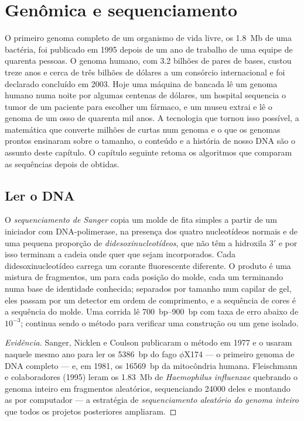 \chapter{Genômica e sequenciamento}\label{ch:b3:genomics}

O primeiro genoma completo de um organismo de vida livre, os
\qty{1.8}{Mb} de uma bactéria, foi publicado em 1995 depois de um ano
de trabalho de uma equipe de quarenta pessoas. O genoma humano, com
\num{3.2} bilhões de pares de bases, custou treze anos e cerca de três
bilhões de dólares a um consórcio internacional e foi declarado
concluído em 2003. Hoje uma máquina de bancada lê um genoma humano
numa noite por algumas centenas de dólares, um hospital sequencia o
tumor de um paciente para escolher um fármaco, e um museu extrai e lê
o genoma de um osso de quarenta mil anos. A tecnologia que tornou isso
possível, a matemática que converte milhões de  curtas num
genoma e o que os genomas prontos ensinaram sobre o tamanho, o
conteúdo e a história de nosso DNA são o assunto deste capítulo. O
capítulo seguinte retoma os algoritmos que comparam as sequências
depois de obtidas.

\section{Ler o DNA}

\begin{definition}\label{def:b3:genomics:sanger}
O \emph{sequenciamento de Sanger} copia um molde de fita simples a
partir de um iniciador com DNA-polimerase, na presença dos quatro
nucleotídeos normais e de uma pequena proporção de
\emph{didesoxinucleotídeos}, que não têm a hidroxila 3$'$ e por isso
terminam a cadeia onde quer que sejam incorporados. Cada
didesoxinucleotídeo carrega um corante fluorescente diferente. O
produto é uma mistura de fragmentos, um para cada posição do molde,
cada um terminando numa base de identidade conhecida; separados por
tamanho num capilar de gel, eles passam por um detector em ordem de
comprimento, e a sequência de cores é a sequência do molde. Uma
corrida lê \qtyrange{700}{900}{bp} com taxa de erro abaixo de
$10^{-3}$; continua sendo o método para verificar uma construção ou um
gene isolado.
\end{definition}

\begin{proof}[Evidência]
Sanger, Nicklen e Coulson publicaram o método em 1977 e o usaram
naquele mesmo ano para ler os \qty{5386}{bp} do fago $\phi$X174 --- o
primeiro genoma de DNA completo --- e, em 1981, os \qty{16569}{bp} da
mitocôndria humana. Fleischmann e colaboradores (1995) leram os
\qty{1.83}{Mb} de \emph{Haemophilus influenzae} quebrando o genoma
inteiro em fragmentos aleatórios, sequenciando \num{24000} deles e
montando as  por computador --- a estratégia de
\emph{sequenciamento aleatório do genoma inteiro} que todos os projetos
posteriores ampliaram.
\end{proof}

